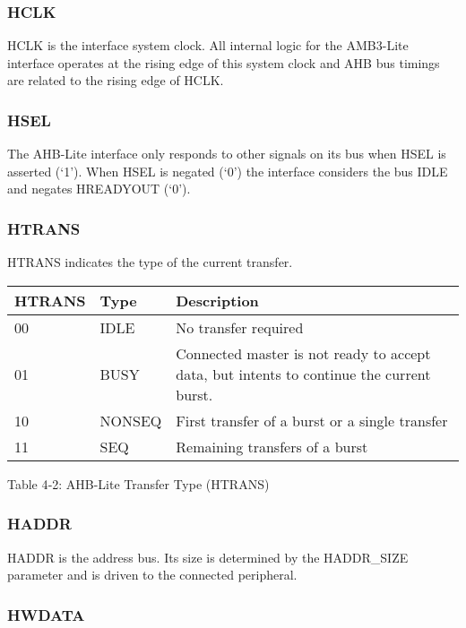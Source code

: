 \subsubsection{HCLK}\label{hclk}

HCLK is the interface system clock. All internal logic for the AMB3-Lite
interface operates at the rising edge of this system clock and AHB bus
timings are related to the rising edge of HCLK.

\subsubsection{HSEL}\label{hsel}

The AHB-Lite interface only responds to other signals on its bus when
HSEL is asserted (`1'). When HSEL is negated (`0') the interface
considers the bus IDLE and negates HREADYOUT (`0').

\protect\hypertarget{_Toc346441257}{}{\protect\hypertarget{_Toc346209448}{}{}}

\subsubsection{HTRANS}\label{htrans}

HTRANS indicates the type of the current transfer.

\begin{longtable}[]{@{}lll@{}}
\toprule
HTRANS & Type & Description\tabularnewline
\midrule
\endhead
00 & IDLE & No transfer required\tabularnewline
01 & BUSY & Connected master is not ready to accept data, but intents to
continue the current burst.\tabularnewline
10 & NONSEQ & First transfer of a burst or a single
transfer\tabularnewline
11 & SEQ & Remaining transfers of a burst\tabularnewline
\bottomrule
\end{longtable}

Table 4‑2: AHB-Lite Transfer Type (HTRANS)

\subsubsection{HADDR}\label{haddr}

HADDR is the address bus. Its size is determined by the HADDR\_SIZE
parameter and is driven to the connected peripheral.

\subsubsection{HWDATA}\label{hwdata}

